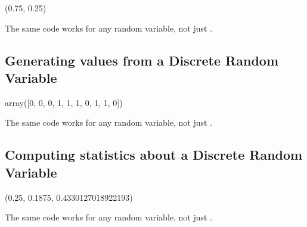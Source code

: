 \documentclass[letterpaper,10pt,english]{jupyterBook}
\begin{document}
\begin{sphinxVerbatim}[commandchars=\\\{\}]
(0.75, 0.25)
\end{sphinxVerbatim}

\sphinxAtStartPar
The same code works for any random variable, not just .


\subsection{Generating values from a Discrete Random Variable}
\label{\detokenize{GB213-review-in-Python:generating-values-from-a-discrete-random-variable}}
\begin{sphinxVerbatim}[commandchars=\\\{\}]
    
\end{sphinxVerbatim}

\begin{sphinxVerbatim}[commandchars=\\\{\}]
array([0, 0, 0, 1, 1, 1, 0, 1, 1, 0])
\end{sphinxVerbatim}

\sphinxAtStartPar
The same code works for any random variable, not just .


\subsection{Computing statistics about a Discrete Random Variable}
\label{\detokenize{GB213-review-in-Python:computing-statistics-about-a-discrete-random-variable}}
\begin{sphinxVerbatim}[commandchars=\\\{\}]
    
\end{sphinxVerbatim}

\begin{sphinxVerbatim}[commandchars=\\\{\}]
(0.25, 0.1875, 0.4330127018922193)
\end{sphinxVerbatim}

\sphinxAtStartPar
The same code works for any random variable, not just .
\end{document}
